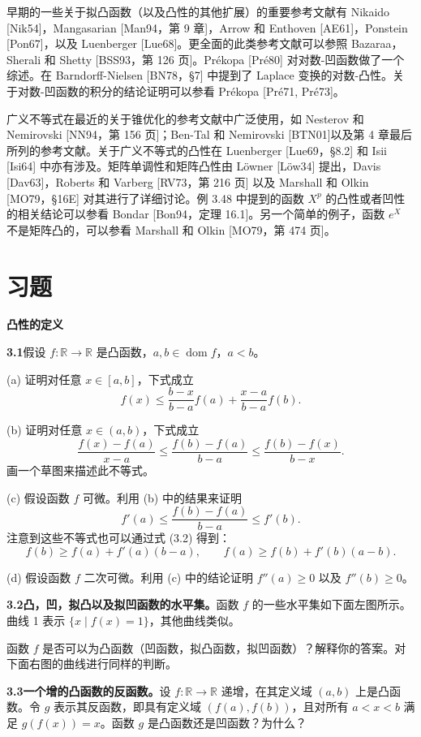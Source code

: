 \documentclass[UTF8,12pt,a4paper,fontset=fandol]{ctexart}
\DeclareMathOperator{\dom}{dom}
\begin{document}
早期的一些关于拟凸函数（以及凸性的其他扩展）的重要参考文献有 Nikaido [Nik54]，Mangasarian [Man94，第 9 章]，Arrow 和 Enthoven [AE61]，Ponstein [Pon67]，以及 Luenberger [Lue68]。更全面的此类参考文献可以参照 Bazaraa，Sherali 和 Shetty [BSS93，第 126 页]。Prékopa [Pré80] 对对数-凹函数做了一个综述。在 Barndorff-Nielsen [BN78，\S7] 中提到了 Laplace 变换的对数-凸性。关于对数-凹函数的积分的结论证明可以参看 Prékopa [Pré71, Pré73]。

广义不等式在最近的关于锥优化的参考文献中广泛使用，如 Nesterov 和 Nemirovski [NN94，第 156 页]；Ben-Tal 和 Nemirovski [BTN01]以及第 4 章最后所列的参考文献。关于广义不等式的凸性在 Luenberger [Lue69，\S8.2] 和 Isii [Isi64] 中亦有涉及。矩阵单调性和矩阵凸性由 Löwner [Löw34] 提出，Davis [Dav63]，Roberts 和 Varberg [RV73，第 216 页] 以及 Marshall 和 Olkin [MO79，\S16E] 对其进行了详细讨论。例 3.48 中提到的函数 $X^p$ 的凸性或者凹性的相关结论可以参看 Bondar [Bon94，定理 16.1]。另一个简单的例子，函数 $e^X$ 不是矩阵凸的，可以参看 Marshall 和 Olkin [MO79，第 474 页]。

\section*{习题}

\noindent\textbf{凸性的定义}

\noindent\textbf{3.1}\quad 假设 $f:\mathbb{R}\to\mathbb{R}$ 是凸函数，$a,b\in\dom f$，$a<b$。

(a) 证明对任意 $x\in[a,b]$，下式成立
\[
f(x)\leq \frac{b-x}{b-a}f(a)+\frac{x-a}{b-a}f(b).
\]

(b) 证明对任意 $x\in(a,b)$，下式成立
\[
\frac{f(x)-f(a)}{x-a}\leq \frac{f(b)-f(a)}{b-a}\leq \frac{f(b)-f(x)}{b-x}.
\]
画一个草图来描述此不等式。

(c) 假设函数 $f$ 可微。利用 (b) 中的结果来证明
\[
f'(a)\leq \frac{f(b)-f(a)}{b-a}\leq f'(b).
\]
注意到这些不等式也可以通过式 (3.2) 得到：
\[
f(b)\geq f(a)+f'(a)(b-a),\qquad
f(a)\geq f(b)+f'(b)(a-b).
\]

(d) 假设函数 $f$ 二次可微。利用 (c) 中的结论证明 $f''(a)\geq0$ 以及 $f''(b)\geq0$。

\noindent\textbf{3.2\quad 凸，凹，拟凸以及拟凹函数的水平集。}\quad 函数 $f$ 的一些水平集如下面左图所示。曲线 1 表示 $\{x\mid f(x)=1\}$，其他曲线类似。

函数 $f$ 是否可以为凸函数（凹函数，拟凸函数，拟凹函数）？解释你的答案。对下面右图的曲线进行同样的判断。

\noindent\textbf{3.3\quad 一个增的凸函数的反函数。}\quad 设 $f:\mathbb{R}\to\mathbb{R}$ 递增，在其定义域 $(a,b)$ 上是凸函数。令 $g$ 表示其反函数，即具有定义域 $(f(a),f(b))$，且对所有 $a<x<b$ 满足 $g(f(x))=x$。函数 $g$ 是凸函数还是凹函数？为什么？
\end{document}
